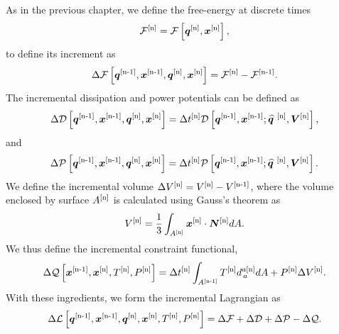  As in the previous chapter, we define the free-energy at discrete times
 \begin{equation} \label{9_46}
   \mathcal{F}^{[\textup{n}]}  =  \mathcal{F}\left[ \bm{q}^{[\textup{n}]}, \bm{x}^{[\textup{n}]}\right],
\end{equation}
to define its increment as
\begin{equation}  \label{9_47}
    \Delta{\mathcal{F}} \left[ \bm{q}^{[\textup{n-1}]}, \bm{x}^{[\textup{n-1}]},  \bm{q}^{[\textup{n}]}, \bm{x}^{[\textup{n}]}\right] = \mathcal{F}^{[\textup{n}]} - \mathcal{F}^{[\textup{n-1}]}.
\end{equation}
The incremental dissipation and power potentials can be defined as 
\begin{align}  \label{9_48}
    \Delta\mathcal{D}\left[ \bm{q}^{[\textup{n-1}]}, \bm{x}^{[\textup{n-1}]},  \bm{q}^{[\textup{n}]}, \bm{x}^{[\textup{n}]}\right] = \Delta t^{[\textup{n}]} \mathcal{D}\left[\bm{q}^{[\textup{n-1}]}, \bm{x}^{[\textup{n-1}]}; \widehat{\bm{q}}^{~[\textup{n}]}, \bm{V}^{[\textup{n}]} \right],
 \end{align} 
 and 
\begin{align}  \label{9_49}
    \Delta\mathcal{P}
    \left[ \bm{q}^{[\textup{n-1}]}, \bm{x}^{[\textup{n-1}]},  \bm{q}^{[\textup{n}]}, \bm{x}^{[\textup{n}]}\right] = \Delta t^{[\textup{n}]} \mathcal{P}\left[\bm{q}^{[\textup{n-1}]}, \bm{x}^{[\textup{n-1}]}; \widehat{\bm{q}}^{~[\textup{n}]}, \bm{V}^{[\textup{n}]} \right].
 \end{align} 
We define the incremental volume $\Delta V^{[\textup{n}]} = V^{[\textup{n}]}- V^{[\textup{n-1}]}$, where the volume enclosed by surface $A^{[\textup{n}]}$ is calculated using Gauss's theorem as
\begin{equation} \label{9_51}
    V^{[\textup{n}]} = \frac{1}{3} \int_{A^{[\textup{n}]}} \bm{x}^{[\textup{n}]} \cdot \bm{N}^{[\textup{n}]}  dA.
\end{equation}
We thus define the incremental constraint functional, 
\begin{equation} \label{9_50}
    \Delta\mathcal{Q}\left[\bm{x}^{[\textup{n-1}]}, \bm{x}^{[\textup{n}]}, T^{[\textup{n}]},P^{[\textup{n}]} \right] = \Delta t^{[\textup{n}]}\int_{A^{[\textup{n-1}]} } T^{[\textup{n}]} d^{a[\textup{n}]}_{\,a}d A  + P^{[\textup{n}]} \Delta V^{[\textup{n}]}.
\end{equation}
With these ingredients, we form the incremental Lagrangian as 
 \begin{equation} \label{9_52}
    \Delta \mathcal{L} \left[ \bm{q}^{[\textup{n-1}]}, \bm{x}^{[\textup{n-1}]},  \bm{q}^{[\textup{n}]}, \bm{x}^{[\textup{n}]}, T^{[\textup{n}]},P^{[\textup{n}]}   \right]  = \Delta {\mathcal{F}} + \Delta \mathcal{D} +  \Delta \mathcal{P} -  \Delta \mathcal{Q}.
\end{equation}

